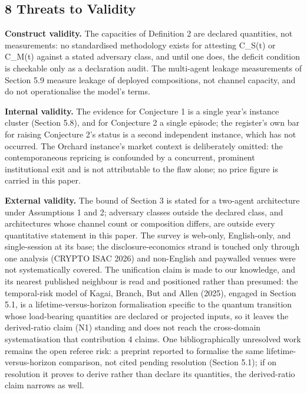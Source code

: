 \documentclass[
]{llncs}
\begin{document}
\subsection{8 Threats to Validity}\label{threats-to-validity}

\textbf{Construct validity.} The capacities of Definition 2 are declared
quantities, not measurements: no standardised methodology exists for
attesting C\_S(t) or C\_M(t) against a stated adversary class, and until
one does, the deficit condition is checkable only as a declaration
audit. The multi-agent leakage measurements of Section 5.9 measure
leakage of deployed compositions, not channel capacity, and do not
operationalise the model's terms.

\textbf{Internal validity.} The evidence for Conjecture 1 is a single
year's instance cluster (Section 5.8), and for Conjecture 2 a single
episode; the register's own bar for raising Conjecture 2's status is a
second independent instance, which has not occurred. The Orchard
instance's market context is deliberately omitted: the contemporaneous
repricing is confounded by a concurrent, prominent institutional exit
and is not attributable to the flaw alone; no price figure is carried in
this paper.

\textbf{External validity.} The bound of Section 3 is stated for a
two-agent architecture under Assumptions 1 and 2; adversary classes
outside the declared class, and architectures whose channel count or
composition differs, are outside every quantitative statement in this
paper. The survey is web-only, English-only, and single-session at its
base; the disclosure-economics strand is touched only through one
analysis (CRYPTO ISAC 2026) and non-English and paywalled venues were
not systematically covered. The unification claim is made to our
knowledge, and its nearest published neighbour is read and positioned
rather than presumed: the temporal-risk model of Kagai, Branch, But and
Allen (2025), engaged in Section 5.1, is a lifetime-versus-horizon
formalisation specific to the quantum transition whose load-bearing
quantities are declared or projected inputs, so it leaves the
derived-ratio claim (N1) standing and does not reach the cross-domain
systematisation that contribution 4 claims. One bibliographically
unresolved work remains the open referee risk: a preprint reported to
formalise the same lifetime-versus-horizon comparison, not cited pending
resolution (Section 5.1); if on resolution it proves to derive rather
than declare its quantities, the derived-ratio claim narrows as well.
\end{document}
